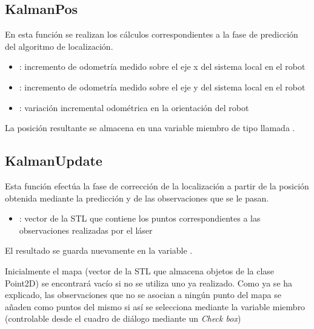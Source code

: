 \subsection{KalmanPos}

 

En esta función se realizan los cálculos correspondientes a la fase de predicción del algoritmo de localización.

\begin{itemize}
  \item {}: incremento de odometría medido sobre el eje x del sistema local en el robot
  \item {}: incremento de odometría medido sobre el eje y del sistema local en el robot
  \item {}: variación incremental odométrica en la orientación del robot
\end{itemize}

La posición resultante se almacena en una variable miembro de tipo  llamada .

\subsection{KalmanUpdate}


Esta función efectúa la fase de corrección de la localización a partir de la posición obtenida mediante la predicción y de las observaciones que se le pasan.

\begin{itemize}
  \item {}: vector de la STL que contiene los puntos correspondientes a las observaciones realizadas por el láser
\end{itemize}

El resultado se guarda nuevamente en la variable .

Inicialmente el mapa (vector de la STL que almacena objetos de la clase Point2D) se encontrará vacío si no se utiliza uno ya realizado. Como ya se ha explicado, las observaciones que no se asocian a ningún punto del mapa se añaden como puntos del mismo si así se selecciona mediante la variable miembro  (controlable desde el cuadro de diálogo mediante un \emph{Check box})

